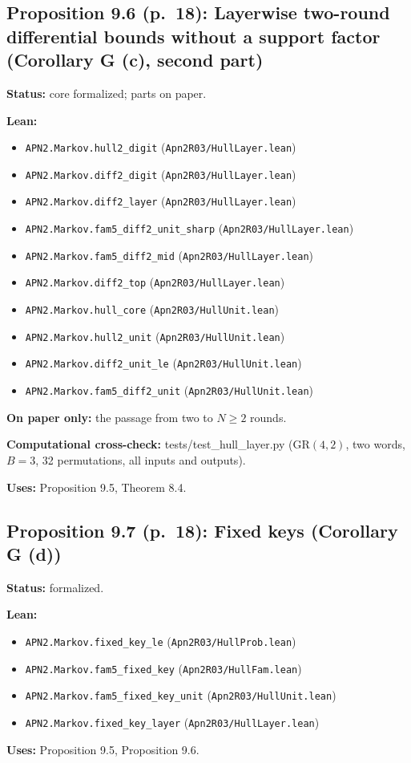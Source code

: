 \documentclass[11pt]{article}
\begin{document}
\subsection*{Proposition 9.6 (p.~18): Layerwise two-round differential bounds without a support factor (Corollary G (c), second part)}
\textbf{Status:} core formalized; parts on paper.\par
\textbf{Lean:}\begin{itemize}\setlength\itemsep{0pt}
\item \texttt{APN2.Markov.hull2\_digit} \hfill (\texttt{Apn2R03/HullLayer.lean})
\item \texttt{APN2.Markov.diff2\_digit} \hfill (\texttt{Apn2R03/HullLayer.lean})
\item \texttt{APN2.Markov.diff2\_layer} \hfill (\texttt{Apn2R03/HullLayer.lean})
\item \texttt{APN2.Markov.fam5\_diff2\_unit\_sharp} \hfill (\texttt{Apn2R03/HullLayer.lean})
\item \texttt{APN2.Markov.fam5\_diff2\_mid} \hfill (\texttt{Apn2R03/HullLayer.lean})
\item \texttt{APN2.Markov.diff2\_top} \hfill (\texttt{Apn2R03/HullLayer.lean})
\item \texttt{APN2.Markov.hull\_core} \hfill (\texttt{Apn2R03/HullUnit.lean})
\item \texttt{APN2.Markov.hull2\_unit} \hfill (\texttt{Apn2R03/HullUnit.lean})
\item \texttt{APN2.Markov.diff2\_unit\_le} \hfill (\texttt{Apn2R03/HullUnit.lean})
\item \texttt{APN2.Markov.fam5\_diff2\_unit} \hfill (\texttt{Apn2R03/HullUnit.lean})
\end{itemize}
\textbf{On paper only:} the passage from two to $N\ge2$ rounds.\par
\textbf{Computational cross-check:} tests/test\_hull\_layer.py ($\mathrm{GR}(4,2)$, two words, $B=3$, 32 permutations, all inputs and outputs).\par
\textbf{Uses:} Proposition 9.5, Theorem 8.4.\par
\subsection*{Proposition 9.7 (p.~18): Fixed keys (Corollary G (d))}
\textbf{Status:} formalized.\par
\textbf{Lean:}\begin{itemize}\setlength\itemsep{0pt}
\item \texttt{APN2.Markov.fixed\_key\_le} \hfill (\texttt{Apn2R03/HullProb.lean})
\item \texttt{APN2.Markov.fam5\_fixed\_key} \hfill (\texttt{Apn2R03/HullFam.lean})
\item \texttt{APN2.Markov.fam5\_fixed\_key\_unit} \hfill (\texttt{Apn2R03/HullUnit.lean})
\item \texttt{APN2.Markov.fixed\_key\_layer} \hfill (\texttt{Apn2R03/HullLayer.lean})
\end{itemize}
\textbf{Uses:} Proposition 9.5, Proposition 9.6.\par
\end{document}
